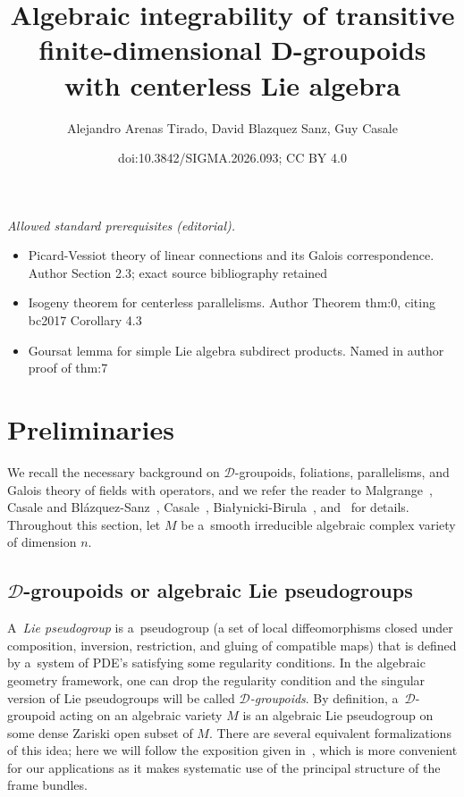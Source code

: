 \documentclass[10pt,a4paper]{amsart}
\title{Algebraic integrability of transitive finite-dimensional D-groupoids with centerless Lie algebra}
\author{Alejandro Arenas Tirado, David Blazquez Sanz, Guy Casale}
\date{doi:10.3842/SIGMA.2026.093; CC BY 4.0}
\numberwithin{equation}{section}
\theoremstyle{definition}
\begin{document}
\maketitle
\noindent\textit{Allowed standard prerequisites (editorial).}\begin{itemize}
\item Picard-Vessiot theory of linear connections and its Galois correspondence. Author Section 2.3; exact source bibliography retained
\item Isogeny theorem for centerless parallelisms. Author Theorem thm:0, citing bc2017 Corollary 4.3
\item Goursat lemma for simple Lie algebra subdirect products. Named in author proof of thm:7
\end{itemize}\medskip
\section{Preliminaries}

We recall the necessary background on $\mathcal{D}$-groupoids, foliations, parallelisms, and Galois theory of fields with operators, and we refer the reader to Malgrange~\cite{malgrange2012leon}, Casale and Bl\'azquez-Sanz~\cite{bc2017}, Casale~\cite{Casale2004SurLG}, Bia{\l}ynicki-Birula~\cite{bialynicki1962galois}, and~\cite{Casale_BlazquezSanz_ArenasTirado_2025} for details. Throughout this section, let $M$ be a~smooth irreducible algebraic complex variety of dimension $n$.

\subsection[D-groupoids or algebraic Lie pseudogroups]{$\boldsymbol{\mathcal{D}}$-groupoids or algebraic Lie pseudogroups}

 A~\textit{Lie pseudogroup} is a~pseudogroup (a set of local diffeomorphisms closed under composition, inversion, restriction, and gluing of compatible maps) that is defined by a~system of PDE's satisfying some regularity conditions. In the algebraic geometry framework, one can drop the regularity condition and the singular version of Lie pseudogroups will be called \textit{$ \mathcal D$-groupoids}. By definition, a~$\mathcal D$-groupoid acting on an algebraic variety $M$ is an algebraic Lie pseudogroup on some dense Zariski open subset of $M$. There are several equivalent formalizations of this idea; here we will follow the exposition given in~\cite[Section 2]{bcd2022malgrange}, which is more convenient for our applications as it makes systematic use of the principal structure of the frame bundles.
\end{document}
